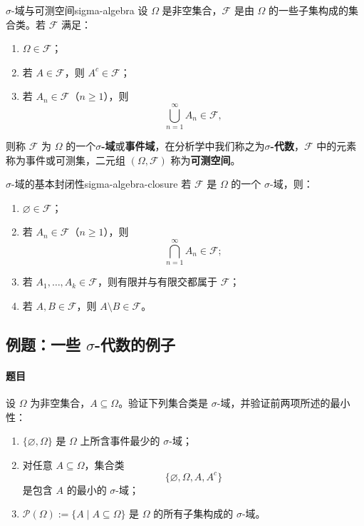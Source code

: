 \begin{mydefinition}{$\sigma$-域与可测空间}{sigma-algebra}
设 $\Omega$ 是非空集合，$\mathscr{F}$ 是由 $\Omega$ 的一些子集构成的集合类。若 $\mathscr{F}$ 满足：
\begin{enumerate}
\item $\Omega\in\mathscr{F}$；
\item 若 $A\in\mathscr{F}$，则 $A^c\in\mathscr{F}$；
\item 若 $A_n\in\mathscr{F}$（$n\geq1$），则
\[
\bigcup_{n=1}^{\infty}A_n\in\mathscr{F},
\]
\end{enumerate}
则称 $\mathscr{F}$ 为 $\Omega$ 的一个\textbf{$\sigma$-域}或\textbf{事件域}，在分析学中我们称之为\textbf{$\sigma$-代数}，$\mathscr{F}$ 中的元素称为事件或可测集，二元组 $(\Omega,\mathscr{F})$ 称为\textbf{可测空间}。
\end{mydefinition}

\begin{proposition}{$\sigma$-域的基本封闭性}{sigma-algebra-closure}
若 $\mathscr{F}$ 是 $\Omega$ 的一个 $\sigma$-域，则：
\begin{enumerate}
\item $\varnothing\in\mathscr{F}$；
\item 若 $A_n\in\mathscr{F}$（$n\geq1$），则
\[
\bigcap_{n=1}^{\infty}A_n\in\mathscr{F};
\]
\item 若 $A_1,\ldots,A_k\in\mathscr{F}$，则有限并与有限交都属于 $\mathscr{F}$；
\item 若 $A,B\in\mathscr{F}$，则 $A\setminus B\in\mathscr{F}$。
\end{enumerate}
\end{proposition}

\subsection{例题：\texorpdfstring{一些 $\sigma$-代数的例子}{一些 sigma-代数的例子}}\label{note:c1:e4}
\paragraph{题目}
设 $\Omega$ 为非空集合，$A\subseteq\Omega$。验证下列集合类是 $\sigma$-域，并验证前两项所述的最小性：
\begin{enumerate}
\item $\{\varnothing,\Omega\}$ 是 $\Omega$ 上所含事件最少的 $\sigma$-域；
\item 对任意 $A\subseteq\Omega$，集合类
\[
\{\varnothing,\Omega,A,A^c\}
\]
是包含 $A$ 的最小的 $\sigma$-域；
\item $\mathcal{P}(\Omega):=\{A\mid A\subseteq\Omega\}$ 是 $\Omega$ 的所有子集构成的 $\sigma$-域。
\end{enumerate}

